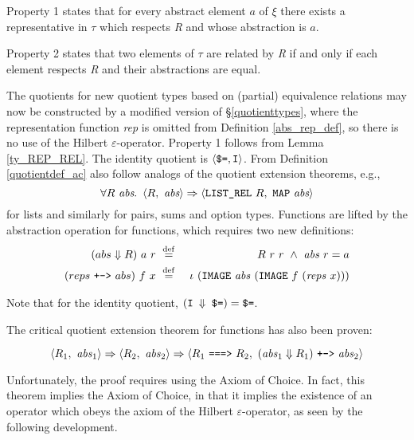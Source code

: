 \documentclass[envcountsame,runningheads]{llncs}
\def\defeq{\stackrel{\mathrm{def}}{=}}
\newcommand{\repofabs}{\Downarrow}
\begin{document}
Property 1 states that for every abstract element $a$ of $\xi$
there exists a representative in $\tau$ which respects {\it R\/} and whose abstraction is $a$.

Property 2 states that two elements of $\tau$ are related by {\it R\/}
if and only if
each element respects {\it R\/} and their abstractions are equal.

The quotients for new quotient types
based on (partial) equivalence relations may now be
constructed by a modified version of \S \ref{quotienttypes},
where the representation function {\it rep\/} is omitted
from Definition \ref{abs_rep_def}, so there is no
use of the Hilbert $\varepsilon$-operator.
Property 1 follows from Lemma \ref{ty_REP_REL}.
%
The identity quotient is
$\langle \mbox{\tt \$=},\mbox{\tt I} \rangle$.
From Definition \ref{quotientdef_ac}
also follow analogs of the quotient extension theorems, e.g.,
$$
\forall R\ \mbox{\it abs}.\ \,
\langle R,\ \mbox{\it abs} \rangle \Rightarrow
\langle \mbox{\tt LIST\_REL}\ R,\ \mbox{\tt MAP}\ \mbox{\it abs} \rangle$$
\noindent
for lists
and similarly for pairs, sums and option types. 
Functions are lifted by
the abstraction operation for functions, which requires two new definitions:
\begin{eqnarray*}
(abs \repofabs R) \ a \ r \ & \defeq & \ 
R\ r\ r\ \wedge \ {\it abs}\ r = a
\\
(reps \ \mbox{\tt +->} \ abs) \ f \ x \ & \defeq & \ 
\iota \ ({\tt IMAGE}\ {\it abs}\ ({\tt IMAGE}\ f\ ({\it reps}\ x)))
\end{eqnarray*}
%
\begin{comment}
\begin{eqnarray*}
abs \repofabs R \ & \defeq & \ 
\lambda a{\mbox{\tt :}\xi}.\ 
\lambda r{\mbox{\tt :}\tau}.\ 
R\ r\ r\ \wedge \ {\it abs}\ r = a
\\
rep \ \mbox{\tt +->} \ abs \ & \defeq & \ 
\lambda f
.\ \lambda x.\ 
\iota \ ({\tt IMAGE}\ {\it abs}\ ({\tt IMAGE}\ f\ ({\it rep}\ x)))
\end{eqnarray*}
\end{comment}

\noindent
Note that for the identity quotient, $(\mbox{\tt I $\repofabs$ \$=}) = \mbox{\tt \$=}$.

The critical quotient extension
theorem for functions has also been proven:
\begin{theorem}[Function quotient extension]
\label{functionquotient}
$$
  \langle R_1,\ {\it abs}_1 \rangle \Rightarrow
  \langle R_2,\ {\it abs}_2 \rangle \Rightarrow
\langle R_1 \ \mbox{\tt ===>} \ R_2,\ 
  ({\it abs}_1 \repofabs R_1) \ \mbox{\tt +->} \ {\it abs}_2 \rangle$$
\end{theorem}
\noindent
Unfortunately, the proof requires using the Axiom of Choice. 
In fact, this theorem implies the Axiom of Choice, in that it implies
the existence of an operator which obeys the axiom of the
Hilbert $\varepsilon$-operator, as seen by the following development.
\end{document}
